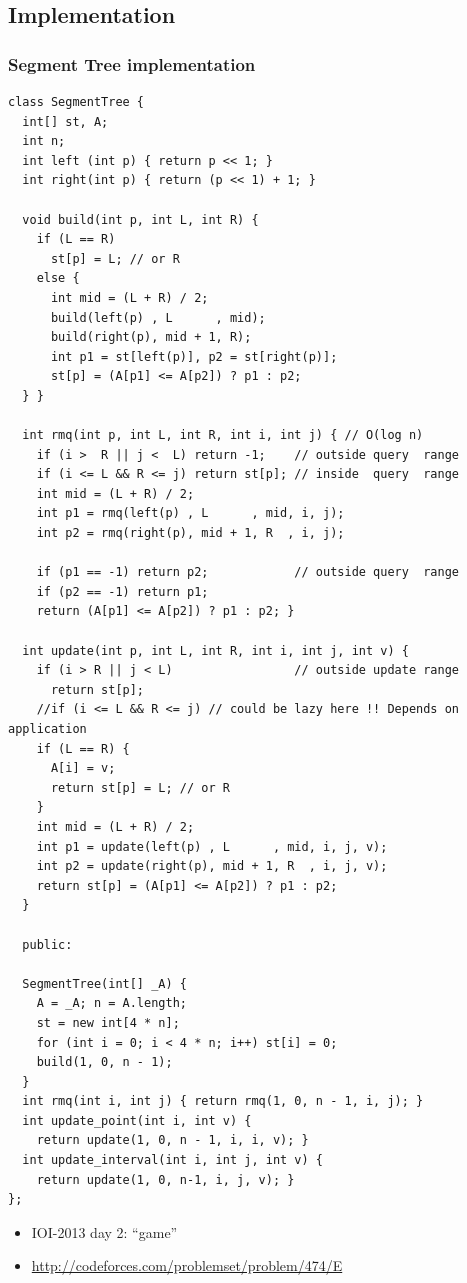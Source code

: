 \documentclass[10pt,svgnames,usenames,table]{beamer} %
\begin{document}
\subsection{Implementation}
\begin{frame}
  \frametitle{Segment Tree implementation}
  \begin{lstlisting}
class SegmentTree {
  int[] st, A;
  int n;
  int left (int p) { return p << 1; }
  int right(int p) { return (p << 1) + 1; }

  void build(int p, int L, int R) {
    if (L == R)
      st[p] = L; // or R
    else {
      int mid = (L + R) / 2;
      build(left(p) , L      , mid);
      build(right(p), mid + 1, R);
      int p1 = st[left(p)], p2 = st[right(p)];
      st[p] = (A[p1] <= A[p2]) ? p1 : p2;
  } }

  int rmq(int p, int L, int R, int i, int j) { // O(log n)
    if (i >  R || j <  L) return -1;    // outside query  range
    if (i <= L && R <= j) return st[p]; // inside  query  range
    int mid = (L + R) / 2;
    int p1 = rmq(left(p) , L      , mid, i, j);
    int p2 = rmq(right(p), mid + 1, R  , i, j);

    if (p1 == -1) return p2;            // outside query  range
    if (p2 == -1) return p1;
    return (A[p1] <= A[p2]) ? p1 : p2; }

  int update(int p, int L, int R, int i, int j, int v) {
    if (i > R || j < L)                 // outside update range
      return st[p];
    //if (i <= L && R <= j) // could be lazy here !! Depends on application
    if (L == R) {
      A[i] = v;
      return st[p] = L; // or R
    }
    int mid = (L + R) / 2;
    int p1 = update(left(p) , L      , mid, i, j, v);
    int p2 = update(right(p), mid + 1, R  , i, j, v);
    return st[p] = (A[p1] <= A[p2]) ? p1 : p2;
  }

  public:

  SegmentTree(int[] _A) {
    A = _A; n = A.length;
    st = new int[4 * n];
    for (int i = 0; i < 4 * n; i++) st[i] = 0;
    build(1, 0, n - 1);
  }
  int rmq(int i, int j) { return rmq(1, 0, n - 1, i, j); }
  int update_point(int i, int v) {
    return update(1, 0, n - 1, i, i, v); }
  int update_interval(int i, int j, int v) {
    return update(1, 0, n-1, i, j, v); }
};
  \end{lstlisting}
  \begin{itemize}
    \item IOI-2013 day 2: ``game''
    \item \url{http://codeforces.com/problemset/problem/474/E}
  \end{itemize}
\end{frame}
\end{document}
